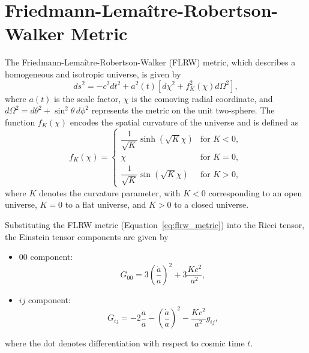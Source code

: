 \section{Friedmann-Lemaître-Robertson-Walker Metric}
The Friedmann-Lemaître-Robertson-Walker (FLRW) metric, which describes a homogeneous and isotropic universe, is given by
\begin{equation}
    ds^2 = -c^2 dt^2 + a^2(t) \left[ d\chi^2 + f_K^2(\chi) d\Omega^2 \right],
    \label{eq:flrw_metric}
\end{equation}
where \( a(t) \) is the scale factor, \( \chi \) is the comoving radial coordinate, and \( d\Omega^2 = d\theta^2 + \sin^2\theta \, d\phi^2 \) represents the metric on the unit two-sphere. The function \( f_K(\chi) \) encodes the spatial curvature of the universe and is defined as
\begin{equation}
    f_K(\chi) = 
    \begin{cases}
        \dfrac{1}{\sqrt{K}} \sinh\left(\sqrt{K}\chi\right) & \text{for } K < 0, \\
        \chi & \text{for } K = 0, \\
        \dfrac{1}{\sqrt{K}} \sin\left(\sqrt{K}\chi\right) & \text{for } K > 0,
    \end{cases}
    \label{eq:fk_definition}
\end{equation}
where \( K \) denotes the curvature parameter, with \( K < 0 \) corresponding to an open universe, \( K = 0 \) to a flat universe, and \( K > 0 \) to a closed universe.

Substituting the FLRW metric (Equation~\eqref{eq:flrw_metric}) into the Ricci tensor, the Einstein tensor components are given by
\begin{itemize}
    \item $00$ component: 
    \begin{equation}
        \label{eq:G00_component}
        G_{00} = 3\left( \dfrac{\dot{a}}{a} \right)^2 + 3\dfrac{Kc^2}{a^2},
    \end{equation}
    \item $ij$ component:
    \begin{equation}
        \label{eq:Gij_component}
        G_{ij} = -2\dfrac{\ddot{a}}{a} - \left( \dfrac{\dot{a}}{a} \right)^2 - \dfrac{Kc^2}{a^2} g_{ij},
    \end{equation}
\end{itemize}
where the dot denotes differentiation with respect to cosmic time \( t \).

